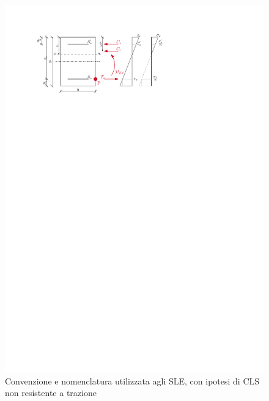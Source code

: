 \begin{figure}[htb]
    \centering
    \includegraphics[height=0.25\textheight]{IMG/IPE_sle_cls_noTraz.pdf}
    \caption{Convenzione e nomenclatura utilizzata agli SLE, con ipotesi di CLS non resistente a trazione}
    \label{fig:sle_convenzione_noTraz}
  \end{figure}
  
